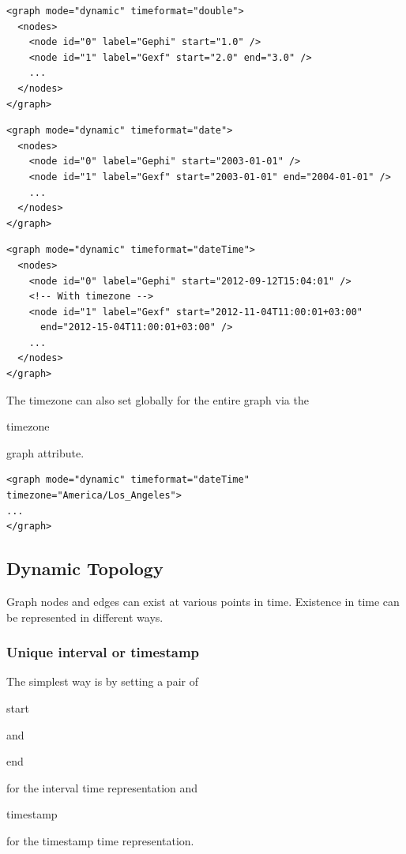 \documentclass[a4paper,10pt]{article}
\begin{document}
\lstset{ style=gexf }
\begin{lstlisting}[caption={Double format}]
<graph mode="dynamic" timeformat="double">
  <nodes>
    <node id="0" label="Gephi" start="1.0" />
    <node id="1" label="Gexf" start="2.0" end="3.0" />
    ...
  </nodes>
</graph>
\end{lstlisting}

\lstset{ style=gexf }
\begin{lstlisting}[caption={Date format}]
<graph mode="dynamic" timeformat="date">
  <nodes>
    <node id="0" label="Gephi" start="2003-01-01" />
    <node id="1" label="Gexf" start="2003-01-01" end="2004-01-01" />
    ...
  </nodes>
</graph>
\end{lstlisting}

\lstset{ style=gexf }
\begin{lstlisting}[caption={Datetime format (also with timezone)}]
<graph mode="dynamic" timeformat="dateTime">
  <nodes>
    <node id="0" label="Gephi" start="2012-09-12T15:04:01" />
    <!-- With timezone -->
    <node id="1" label="Gexf" start="2012-11-04T11:00:01+03:00"
      end="2012-15-04T11:00:01+03:00" />
    ...
  </nodes>
</graph>
\end{lstlisting}

The timezone can also set globally for the entire graph via the \begin{footnotesize}timezone\end{footnotesize} graph attribute.

\lstset{ style=gexf }
\begin{lstlisting}[caption={Global timezone setting}]
<graph mode="dynamic" timeformat="dateTime" timezone="America/Los_Angeles">
...
</graph>
\end{lstlisting}

\subsection{Dynamic Topology}

Graph nodes and edges can exist at various points in time. Existence in time can be represented in different ways.

\subsubsection{Unique interval or timestamp}

The simplest way is by setting a pair of \begin{footnotesize}start\end{footnotesize} and \begin{footnotesize}end\end{footnotesize} for the interval time representation and \begin{footnotesize}timestamp\end{footnotesize} for the timestamp time representation.
\end{document}
